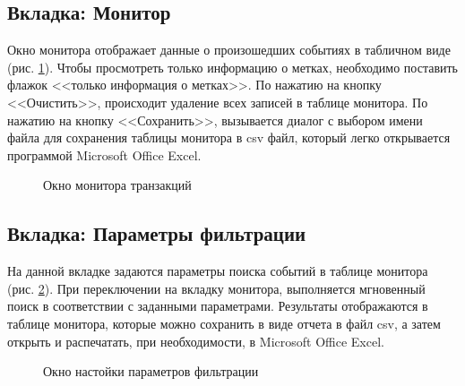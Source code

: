 ﻿\subsection{Вкладка: Монитор}

Окно монитора отображает данные о произошедших событиях в табличном виде (рис. \ref{i:monitor}).
Чтобы просмотреть только информацию о метках, необходимо поставить флажок <<только информация о метках>>.
По нажатию на кнопку <<Очистить>>, происходит удаление всех записей в таблице монитора.
По нажатию на кнопку <<Сохранить>>, вызывается диалог с выбором имени файла для сохранения таблицы монитора в
csv файл, который легко открывается программой Microsoft Office Excel.

\begin{figure}[h]
    \caption{Окно монитора транзакций}
    \label{i:monitor}
\end{figure}

\subsection{Вкладка: Параметры фильтрации}

На данной вкладке задаются параметры поиска событий в таблице монитора (рис. \ref{i:filt}). 
При переключении на вкладку монитора, выполняется мгновенный поиск в соответствии с заданными параметрами.
Результаты отображаются в таблице монитора, которые можно сохранить в виде отчета в файл csv, а затем открыть и распечатать,
при необходимости, в Microsoft Office Excel.

\begin{figure}[h]
    \caption{Окно настойки параметров фильтрации}
    \label{i:filt}
\end{figure}